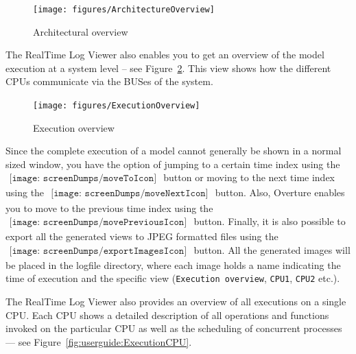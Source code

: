 \documentclass{overturerepchap}
\begin{document}
\begin{figure}[htp]
\begin{center}
  \texttt{[image: figures/ArchitectureOverview]}
  \caption{Architectural overview}
  \label{fig:userguide:ArchitecturalOverview}
\end{center}
\end{figure}

The RealTime Log Viewer also enables you to get an overview of
the model execution at a system level --
see Figure~\ref{fig:userguide:ExecutionOverview}.
This view shows how the different CPUs communicate via the
BUSes of the system.

\begin{figure}[htp]
\begin{center}
  \texttt{[image: figures/ExecutionOverview]}
  \caption{Execution overview}
  \label{fig:userguide:ExecutionOverview}
\end{center}
\end{figure}

Since the complete execution of a model cannot generally be shown in a normal
sized window, you have the option of jumping to a certain time index
using the $
 \begin{array}{l}
\texttt{[image: screenDumps/moveToIcon]}
\end{array}
$ button or moving to the next time index using the $
\begin{array}{l}
\texttt{[image: screenDumps/moveNextIcon]}
\end{array}
$ button. Also, Overture enables you to move to the previous
time index using the $
\begin{array}{l}
\texttt{[image: screenDumps/movePreviousIcon]}
\end{array}
$ button. Finally, it is
also possible to export all the generated views to JPEG formatted files
using the $
\begin{array}{l}
\texttt{[image: screenDumps/exportImagesIcon]}
\end{array}
$ button.  All
the generated images will be placed in the logfile directory, where each image holds a name
indicating the time of execution and the specific view (\texttt{Execution overview}, \texttt{CPU1}, \texttt{CPU2} etc.).

The RealTime Log Viewer also provides an overview of all executions on a single CPU.
Each CPU shows a detailed description of all operations and functions invoked
on the particular CPU as well as the scheduling of concurrent processes --- see
Figure~\ref{fig:userguide:ExecutionCPU}.
\end{document}
